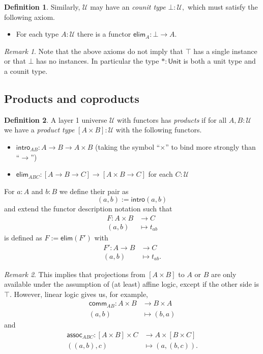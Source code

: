 \documentclass[a4paper]{article}
\theoremstyle{definition}
\newtheorem{definition}{Definition}[section]
\theoremstyle{remark}
\newtheorem*{remark}{Remark}
\newcommand{\defn}{\emph}
\newcommand{\U}{\mathcal{U}}
\newcommand{\nm}{\mathsf}
\newcommand{\universe}{\nm}
\newcommand{\Unit}{\universe{Unit}}
\newcommand{\intro}{\nm{intro}}
\newcommand{\elim}{\nm{elim}}
\begin{document}
\begin{definition}
  Similarly, $\U$ may have an \defn{counit type} $\bot : \U,$ which must satisfy the
  following axiom.
  \begin{itemize}
    \item For each type $A : \U$ there is a functor $\elim_A : \bot \to A.$
  \end{itemize}
\end{definition}

\begin{remark}
  Note that the above axioms do not imply that $\top$ has a single instance or that $\bot$ has no
  instances. In particular the type $\ast : \Unit$ is both a unit type and a counit type.
\end{remark}

\subsection{Products and coproducts}
\label{sec:layer1-products}

\begin{definition}
  A layer 1 universe $\U$ with functors has \defn{products} if for all $A,B : \U$ we have a
  \defn{product type} $[A \times B] : \U$ with the following functors.
  \begin{itemize}
    \item $\intro_{AB} : A \to B \to A \times B$ (taking the symbol ``$\times$'' to bind more
    strongly than ``$\to$'')
    \item $\elim_{ABC} : [A \to B \to C] \to [A \times B \to C]$ for each $C : \U$
  \end{itemize}

  For $a : A$ and $b : B$ we define their pair as
  \[(a,b) := \intro(a,b)\]
  and extend the functor description notation such that
  \begin{align*}
    F : A \times B &\to     C\\
        (a,b)      &\mapsto t_{ab}
  \end{align*}
  is defined as $F := \elim(F')$ with
  \begin{align*}
    F' : A \to B &\to     C\\
         (a,b)   &\mapsto t_{ab}.
  \end{align*}
\end{definition}

\begin{remark}
  This implies that projections from $[A \times B]$ to $A$ or $B$ are only available under the
  assumption of (at least) affine logic, except if the other side is $\top.$ However, linear logic
  gives us, for example,
  \begin{align*}
    \nm{comm}_{AB} : A \times B &\to     B \times A\\
                     (a,b)      &\mapsto (b,a)
  \end{align*}
  and
  \begin{align*}
    \nm{assoc}_{ABC} : [A \times B] \times C &\to     A \times [B \times C]\\
                       ((a,b),c)             &\mapsto (a,(b,c)).
  \end{align*}
\end{remark}
\end{document}
